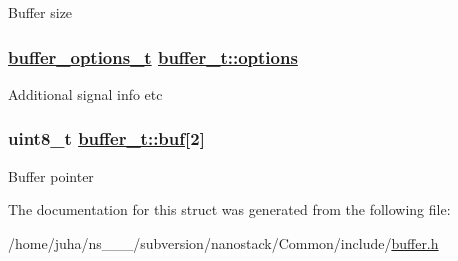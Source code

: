 Buffer size \hypertarget{structbuffer__t_49d73f996520c91c472dd68bc7005e70}{
\subsubsection[options]{\setlength{\rightskip}{0pt plus 5cm}\hyperlink{structbuffer__options__t}{buffer\_\-options\_\-t} \hyperlink{structbuffer__t_49d73f996520c91c472dd68bc7005e70}{buffer\_\-t::options}}}
\label{structbuffer__t_49d73f996520c91c472dd68bc7005e70}


Additional signal info etc \hypertarget{structbuffer__t_ed0f8f327664a6eea8d419fd852a0b46}{
\subsubsection[buf]{\setlength{\rightskip}{0pt plus 5cm}uint8\_\-t \hyperlink{structbuffer__t_ed0f8f327664a6eea8d419fd852a0b46}{buffer\_\-t::buf}\mbox{[}2\mbox{]}}}
\label{structbuffer__t_ed0f8f327664a6eea8d419fd852a0b46}


Buffer pointer 

The documentation for this struct was generated from the following file:\begin{CompactItemize}
\item 
/home/juha/ns\_\_\_/subversion/nanostack/Common/include/\hyperlink{buffer_8h}{buffer.h}\end{CompactItemize}
